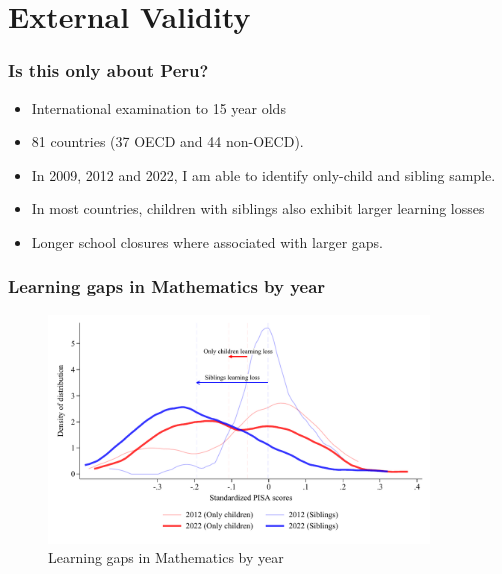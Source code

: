 \documentclass{beamer}
\begin{document}
\section{External Validity}

    \begin{frame}
            \label{frame:pisadata}
            \frametitle{Is this only about Peru?}
        \begin{itemize}
            \item International examination to 15 year olds
            \item 81 countries (37 OECD and 44 non-OECD).
            \item In 2009, 2012 and 2022, I am able to identify only-child and sibling sample.
            \item In most countries, children with siblings also exhibit larger learning losses
            \item Longer school closures where associated with larger gaps.
        \end{itemize}
    \end{frame}

\begin{frame}
    \label{frame:pisagaps}
    \frametitle{Learning gaps in Mathematics by year}
    
    \begin{figure}
        \centering
        \includegraphics[width=0.9\textwidth]{./FIGURES/Descriptive/PISA_distribution_2012_2022_PV4MATH.pdf}
        \caption{Learning gaps in Mathematics by year}
        \label{fig:1a}
    \end{figure}
    
\end{frame}
\end{document}
